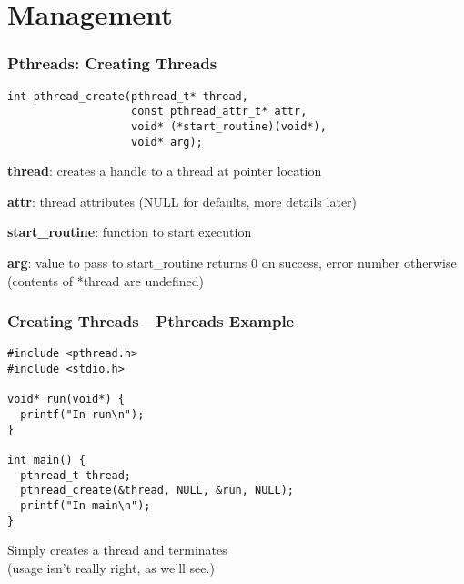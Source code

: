 \documentclass[aspectratio=43]{beamer}
\newenvironment{changemargin}[1]{%
  \begin{list}{}{%
    \setlength{\topsep}{0pt}%
    \setlength{\leftmargin}{#1}%
    \setlength{\rightmargin}{1em}
    \setlength{\listparindent}{\parindent}%
    \setlength{\itemindent}{\parindent}%
    \setlength{\parsep}{\parskip}%
  }%
  \item[]}{\end{list}}
\begin{document}
\section{Management}
\begin{frame}[fragile]
  \frametitle{Pthreads: Creating Threads}

  \begin{changemargin}{1.5cm}
  \begin{lstlisting}
int pthread_create(pthread_t* thread, 
                   const pthread_attr_t* attr,
                   void* (*start_routine)(void*),
                   void* arg);
  \end{lstlisting}
  \vfill
  {\bf thread}: creates a handle to a thread at pointer location

  {\bf attr}: thread attributes (NULL for defaults, more details later)

  {\bf start\_routine}: function to start execution

  {\bf arg}: value to pass to start\_routine
  \vfill
  returns 0 on success, error number otherwise\\(contents of *thread are
  undefined)
  \end{changemargin}
\end{frame}

\begin{frame}[fragile]
  \frametitle{Creating Threads---Pthreads Example}

  \begin{changemargin}{1.5cm}
\begin{lstlisting}
#include <pthread.h>
#include <stdio.h>

void* run(void*) {
  printf("In run\n");
}

int main() {
  pthread_t thread;
  pthread_create(&thread, NULL, &run, NULL);
  printf("In main\n");
}
\end{lstlisting}
  \vfill
  Simply creates a thread and terminates\\(usage isn't really right, as we'll
  see.)
  \end{changemargin}
\end{frame}
\end{document}
